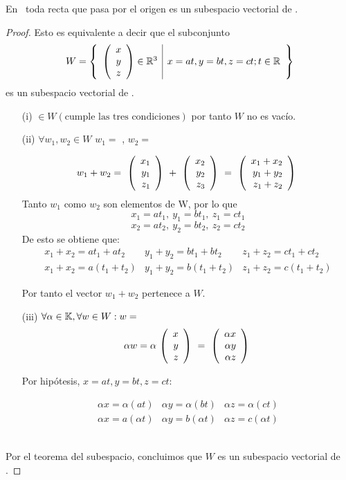 \begin{theorem}
En \rtres \ toda recta que pasa por el origen es un subespacio vectorial de \rtres.
\end{theorem}
\begin{proof}

Esto es equivalente a decir que el subconjunto $$ W= \left\{\begin{array}{c|c} {\left( \begin{array}{c} x\\ y\\ z \end{array}\right) \in \mathbb{R}^3 }&{x=at, y=bt, z=ct ;t\in \mathbb{R}} \end{array} \right\}$$ es un subespacio vectorial de \rtres.

\begin{enumerate}
\item[(i)]  $\in W \left( \mbox{cumple las tres condiciones} \right)$
por tanto $W$ no es vac\'io.

\item[(ii)] $\forall w_1, w_2 \in W$ $w_1=$ , $w_2=$

\[
w_1+w_2=\mbox{ \ensuremath{\left( \begin{array}{r} x_1\\ y_1\\ z_1 \end{array} \right) } }+\mbox{ \ensuremath{\left( \begin{array}{r} x_2\\ y_2\\ z_3 \end{array} \right) } }
=\mbox{ \ensuremath{\left( \begin{array}{r} x_1+x_2\\ y_1+y_2\\ z_1+z_2 \end{array} \right) } }
\]
Tanto $w_1$ como $w_2$ son elementos de W, por lo que
\[
x_1=at_1,\ y_1=bt_1,\ z_1=ct_1
\]
\[
x_2=at_2,\ y_2=bt_2,\ z_2=ct_2
\]
De esto se obtiene que:
\[
\begin{array}{ccc}
x_1+x_2=at_1+at_2&y_1+y_2=bt_1+bt_2
&z_1+z_2=ct_1+ct_2
\\
x_1+x_2=a\left(t_1+t_2\right)&
y_1+y_2=b\left(t_1+t_2\right)&
z_1+z_2=c\left(t_1+t_2\right)
\end{array}
\]

Por tanto el vector $w_1+w_2$ pertenece a $W$.

\item[(iii)] $\forall \alpha \in \mbox{$\mathbb{K}$}
, \forall w \in W: w=$
\[
\alpha w=\alpha \mbox{ \ensuremath{\left( \begin{array}{r} x\\ y\\ z \end{array} \right) } }=
\mbox{ \ensuremath{\left( \begin{array}{r} \alpha x\\ \alpha y\\ \alpha z \end{array} \right) } }\]

Por hip\'otesis, $x=at, y=bt, z=ct$:

\[
\begin{array}{ccc}
\alpha x=\alpha \left(at\right)&
\alpha y=\alpha \left(bt\right)&
\alpha z=\alpha \left(ct\right)
\\
\alpha x=a\left(\alpha t\right)&
\alpha y=b\left(\alpha t\right)&
\alpha z=c\left(\alpha t\right)
\end{array}
\]

\end{enumerate}
~\\
Por el teorema del subespacio, concluimos que $W$ es un subespacio 
vectorial de \rtres.

\end{proof}


